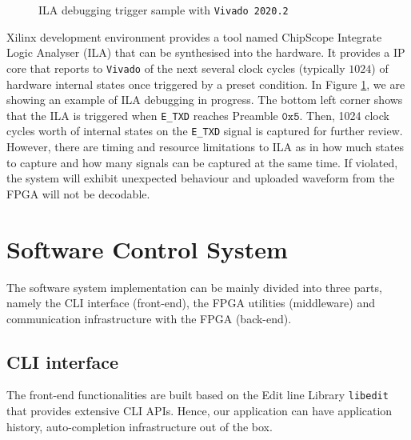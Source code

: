 \documentclass[a4paper]{report}
\newcommand{\code}{\texttt}
\begin{document}
\begin{figure}[h!]
  \caption{ILA debugging trigger sample with \code{Vivado 2020.2}}
  \label{fig:ila-debug-fpga}
\end{figure}

Xilinx development environment provides a tool named ChipScope Integrate Logic Analyser (ILA) that can be synthesised into the hardware. It provides a IP core that reports to \code{Vivado} of the next several clock cycles (typically $1024$) of hardware internal states once triggered by a preset condition. In Figure \ref{fig:ila-debug-fpga}, we are showing an example of ILA debugging in progress. The bottom left corner shows that the ILA is triggered when \code{E\_TXD} reaches Preamble $\mathtt{0x5}$. Then, 1024 clock cycles worth of internal states on the \code{E\_TXD} signal is captured for further review. However, there are timing and resource limitations to ILA as in how much states to capture and how many signals can be captured at the same time. If violated, the system will exhibit unexpected behaviour and uploaded waveform from the FPGA will not be decodable.

\section{Software Control System}

The software system implementation can be mainly divided into three parts, namely the CLI interface (front-end), the FPGA utilities (middleware) and communication infrastructure with the FPGA (back-end).

\subsection{CLI interface}

The front-end functionalities are built based on the Edit line Library \code{libedit} that provides extensive CLI APIs. Hence, our application can have application history, auto-completion infrastructure out of the box.
\end{document}
